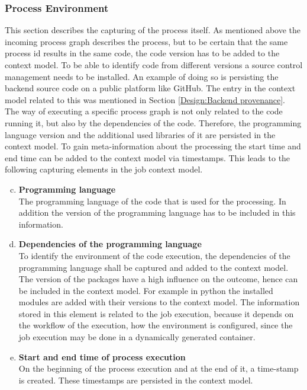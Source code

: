 \documentclass[draft,final]{vutinfth} %
\begin{document}
\subsubsection{Process Environment}\label{Job:Process Data}
This section describes the capturing of the process itself. As mentioned above the incoming process graph describes the process, but to be certain that the same process id results in the same code, the code version has to be added to the context model. To be able to identify code from different versions a source control management needs to be installed. An example of doing so is persisting the backend source code on a public platform like GitHub. The entry in the context model related to this was mentioned in Section \ref{Design:Backend provenance}.  \\
The way of executing a specific process graph is not only related to the code running it, but also by the dependencies of the code. Therefore, the programming language version and the additional used libraries of it are persisted in the context model. To gain meta-information about the processing the start time and end time can be added to the context model via timestamps. This leads to the following capturing elements in the job context model.

\begin{enumerate}[(a)]
	\setcounter{enumi}{2}
	\item \textbf{Programming language}\\
	The programming language of the code that is used for the processing. In addition the version of the programming language has to be included in this information.
	\item \textbf{Dependencies of the programming language}\\
	To identify the environment of the code execution, the dependencies of the programming language shall be captured and added to the context model. The version of the packages have a high influence on the outcome, hence can be included in the context model. For example in python the installed modules are added with their versions to the context model. The information stored in this element is related to the job execution, because it depends on the workflow of the execution, how the environment is configured, since the job execution may be done in a dynamically generated container.
	\item \textbf{Start and end time of process execution}\\
	On the beginning of the process execution and at the end of it, a time-stamp is created. These timestamps are persisted in the context model.
\end{enumerate}
\end{document}
